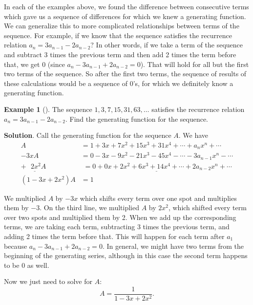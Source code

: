 \documentclass[10pt,]{book}
\theoremstyle{plain}
\theoremstyle{definition}
\theoremstyle{definition}
\newtheorem{example}[theorem]{Example}
\theoremstyle{definition}
\theoremstyle{definition}
\numberwithin{equation}{chapter}
\newcommand{\amp}{&}
\begin{document}
\hypertarget{p-1096}{}%
In each of the examples above, we found the difference between consecutive terms which gave us a sequence of differences for which we knew a generating function. We can generalize this to more complicated relationships between terms of the sequence. For example, if we know that the sequence satisfies the recurrence relation \(a_n = 3a_{n-1} - 2a_{n-2}\)? In other words, if we take a term of the sequence and subtract 3 times the previous term and then add 2 times the term before that, we get 0 (since \(a_n - 3a_{n-1} + 2a_{n-2} = 0\)). That will hold for all but the first two terms of the sequence. So after the first two terms, the sequence of results of these calculations would be a sequence of 0's, for which we definitely know a generating function.%
\begin{example}[]\label{example-25}
\hypertarget{p-1097}{}%
The sequence \(1, 3, 7, 15, 31, 63, \ldots\) satisfies the recurrence relation \(a_n = 3a_{n-1} - 2a_{n-2}\). Find the generating function for the sequence.%
\par\smallskip%
\noindent\textbf{Solution}.\hypertarget{solution-99}{}\quad%
\hypertarget{p-1098}{}%
Call the generating function for the sequence \(A\). We have%
\begin{align*}
A \amp  = 1 + 3x + 7x^2 + 15x^3 + 31x^4 + \cdots + a_nx^n + \cdots\\
-3xA \amp  = 0 - 3x - 9x^2 - 21x^3 - 45x^4 - \cdots - 3a_{n-1}x^n - \cdots\\
\underline{+~~~2x^2A_{~}^{~^{~}}} \amp  \underline{\,\, = 0 + 0x + 2x^2 + 6x^3 + 14x^4 + \cdots + 2a_{n-2}x^n + \cdots}\\
(1-3x+2x^2)A \amp  = 1
\end{align*}
%
\par
\hypertarget{p-1099}{}%
We multiplied \(A\) by \(-3x\) which shifts every term over one spot and multiplies them by \(-3\). On the third line, we multiplied \(A\) by \(2x^2\), which shifted every term over two spots and multiplied them by 2. When we add up the corresponding terms, we are taking each term, subtracting 3 times the previous term, and adding 2 times the term before that. This will happen for each term after \(a_1\) because \(a_n - 3a_{n-1} + 2a_{n-2} = 0\). In general, we might have two terms from the beginning of the generating series, although in this case the second term happens to be 0 as well.%
\par
\hypertarget{p-1100}{}%
Now we just need to solve for \(A\):%
\begin{equation*}
A = \frac{1}{1 - 3x + 2x^2}.
\end{equation*}
%
\end{example}
\typeout{************************************************}
\typeout{************************************************}
\end{document}
